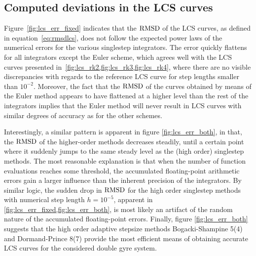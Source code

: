 \subsection{Computed deviations in the LCS curves}
\label{sub:computed_deviations_in_the_lcs_curves}

Figure~\ref{fig:lcs_err_fixed} indicates that the $\operatorname{RMSD}$ of the LCS curves,
as defined in equation~\eqref{eq:rmsdlcs}, does not follow the expected power
laws of the numerical errors for the various singlestep integrators. The error
quickly flattens for all integrators except the Euler scheme, which agrees well
with the LCS curves presented in~\cref{fig:lcs_rk2,fig:lcs_rk3,fig:lcs_rk4},
where there are no visible discrepancies with regards to the reference LCS curve
for step lengths smaller than $10^{-2}$. Moreover, the fact that the $\operatorname{RMSD}$
of the curves obtained by means of the Euler method appears to have flattened
at a higher level than the rest of the integrators implies that the Euler
method will never result in LCS curves with similar degrees of accuracy
as for the other schemes.





Interestingly, a similar pattern is apparent in figure
\ref{fig:lcs_err_both}, in that, the $\operatorname{RMSD}$ of the higher-order methods
decreases steadily, until a certain point where it suddenly jumps to the same
steady level as the (high order) singlestep methods. The most reasonable
explanation is that when the number of function evaluations reaches some
threshold, the accumulated floating-point arithmetic errors gain a larger
influence than the inherent precision of the integrators. By similar logic, the
sudden drop in $\operatorname{RMSD}$ for the high order singlestep methods with numerical
step length $h=10^{-5}$, apparent in
\cref{fig:lcs_err_fixed,fig:lcs_err_both}, is most likely an artifact of the random
nature of the accumulated floating-point errors.
Finally, figure
\ref{fig:lcs_err_both} suggests that the high order
adaptive stepsize methods Bogacki-Shampine 5(4) and
Dormand-Prince 8(7) provide the most efficient means of obtaining
accurate LCS curves for the considered double gyre system.
